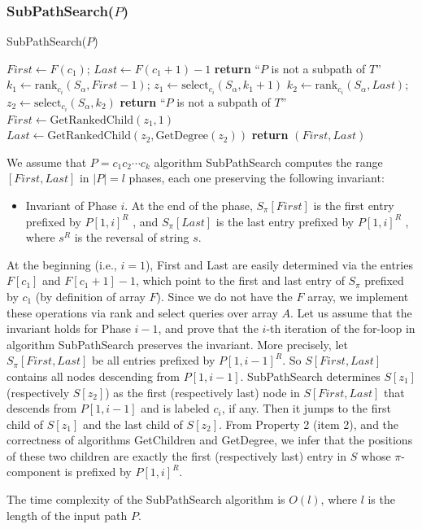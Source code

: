 \subsubsection*{SubPathSearch($P$)}

\begin{algorithm}[H]
    \caption{SubPathSearch($P$)}
    \label{alg:subpathsearch}
    \begin{algorithmic}[1]
    \State $First \gets F(c_1)$; $Last \gets F(c_1 + 1) - 1$
        \State \textbf{return} ``$P$ is not a subpath of $T$''
    \EndIf
        \State $k_1 \gets \text{rank}_{c_i}(S_\alpha, First - 1)$; $z_1 \gets \text{select}_{c_i}(S_\alpha, k_1 + 1)$
        \State $k_2 \gets \text{rank}_{c_i}(S_\alpha, Last)$; $z_2 \gets \text{select}_{c_i}(S_\alpha, k_2)$
            \State \textbf{return} ``$P$ is not a subpath of $T$''
        \EndIf
        \State $First \gets \text{GetRankedChild}(z_1, 1)$ 
        \State $Last \gets \text{GetRankedChild}(z_2, \text{GetDegree}(z_2))$ 
    \EndFor
    \State \textbf{return} $(First, Last)$
    \end{algorithmic}
\end{algorithm}

We assume that $P = c_1c_2 \cdots c_k$ algorithm SubPathSearch computes the range $[First, Last]$ in $|P| = l$ phases, each one preserving the following invariant:

\begin{itemize}
    \item Invariant of Phase $i$. At the end of the phase, $S_{\pi}[First]$ is the first entry prefixed by $P[1, i]^R$ , and $S_{\pi}[Last]$ is the last entry prefixed by $P[1, i]^R$ , where $s^R$ is the reversal of string $s$.
\end{itemize}

At the beginning (i.e., $i = 1$), First and Last are easily determined via the entries $F[c_1]$ and $F[c_1 + 1] - 1$, which point to the first and last entry of $S_{\pi}$ prefixed by $c_1$ (by definition of array $F$). Since we do not have the $F$ array, we implement these operations via rank and select queries over array $A$. Let us assume that the invariant holds for Phase $i - 1$, and prove that the $i$-th iteration of the for-loop in algorithm SubPathSearch preserves the invariant. More precisely, let $S_{\pi}[First, Last]$ be all entries prefixed by $P[1, i - 1]^R$. So $S[First, Last]$ contains all nodes descending from $P[1, i - 1]$. SubPathSearch determines $S[z_1]$ (respectively $S[z_2]$) as the first (respectively last) node in $S[First, Last]$ that descends from $P[1, i - 1]$ and is labeled $c_i$, if any. Then it jumps to the first child of $S[z_1]$ and the last child of $S[z_2]$. From Property 2 (item 2), and the correctness of algorithms GetChildren and GetDegree, we infer that the positions of these two children are exactly the first (respectively last) entry in $S$ whose $\pi$-component is prefixed by $P[1, i]^R$. 

The time complexity of the SubPathSearch algorithm is $O(l)$, where $l$ is the length of the input path $P$.

